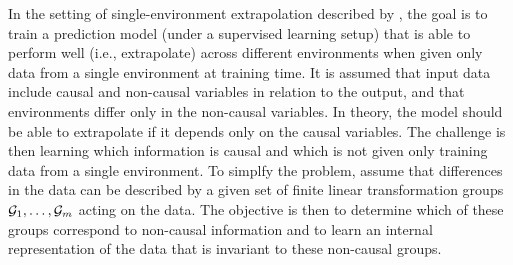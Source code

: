In the setting of single-environment extrapolation described by \textcite{Mouli:2021}, the goal is to train a prediction model (under a supervised learning setup) that is able to perform well (i.e., extrapolate) across different environments when given only data from a single environment at training time. It is assumed that input data include causal and non-causal variables in relation to the output, and that environments differ only in the non-causal variables. In theory, the model should be able to extrapolate if it depends only on the causal variables. The challenge is then learning which information is causal and which is not given only training data from a single environment. To simplfy the problem, \citeauthor{Mouli:2021} assume that differences in the data can be described by a given set of finite linear transformation groups $\mathcal{G}_1,\ldots,\mathcal{G}_m$ acting on the data. The objective is then to determine which of these groups correspond to non-causal information and to learn an internal representation of the data that is invariant to these non-causal groups.
\\

